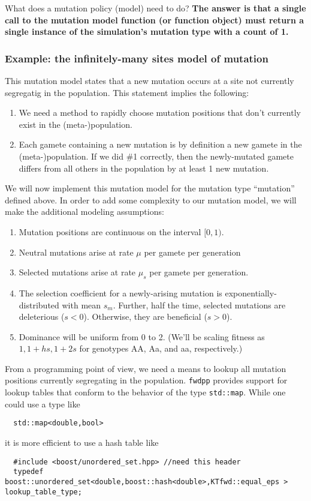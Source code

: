 \documentclass{article}
\begin{document}
What does a mutation policy (model) need to do?  \textbf{The answer is that a single call to the mutation model function (or function object) must return a single instance of the simulation's mutation type with a count of 1.}

\subsubsection{Example: the infinitely-many sites model of mutation}
This mutation model states that a new mutation occurs at a site not currently segregatig in the population.  This statement implies the following:
\begin{enumerate}
\item We need a method to rapidly choose mutation positions that don't currently exist in the (meta-)population.
\item Each gamete containing a new mutation is by definition a new gamete in the (meta-)population.  If we did \#1 correctly, then the newly-mutated gamete differs from all others in the population by at least 1 new mutation.
\end{enumerate}

We will now implement this mutation model for the mutation type ``mutation'' defined above.  In order to add some complexity to our mutation model, we will make the additional modeling assumptions:
\begin{enumerate}
\item Mutation positions are continuous on the interval $[0,1)$.
\item Neutral mutations arise at rate $\mu$ per gamete per generation
\item Selected mutations arise at rate $\mu_s$ per gamete per generation.
\item The selection coefficient for a newly-arising mutation is exponentially-distributed with mean $s_m$.  Further, half the time, selected mutations are deleterious ($s < 0$).  Otherwise, they are beneficial ($s > 0$).
\item Dominance will be uniform from 0 to 2.  (We'll be scaling fitness as $1, 1+hs, 1+2s$ for genotypes AA, Aa, and aa, respectively.)
\end{enumerate}

From a programming point of view, we need a means to lookup all mutation positions currently segregating in the population.  \texttt{fwdpp} provides support for lookup tables that conform to the behavior of the type \texttt{std::map}.  While one could use a type like 
\begin{lstlisting}
  std::map<double,bool>
\end{lstlisting}
it is more efficient to use a hash table like 
\begin{lstlisting}
  #include <boost/unordered_set.hpp> //need this header
  typedef boost::unordered_set<double,boost::hash<double>,KTfwd::equal_eps > lookup_table_type;
\end{lstlisting}
\end{document}

